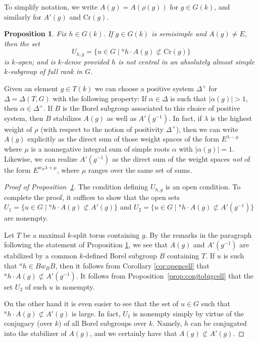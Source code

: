 \documentclass{amsart}
\theoremstyle{plain}
\newtheorem{proposition}[theorem]{Proposition}
\theoremstyle{definition}
\theoremstyle{remark}
\providecommand{\abs}[1]{\lvert#1\rvert}
\begin{document}
To simplify notation, we write $A(g) = A(\rho(g))$ for $g \in G(k)$, and
similarly for $A'(g)$ and $\mathrm{Cr}(g)$.

\begin{proposition}\label{prop:dyslexictits}
Fix $h\in G(k)$. If $g \in G(k)$ is semisimple and $A(g) \neq E$, then the set
$$U_{h, g} = \{u \in G \mid \mbox{}^{u}h\cdot A(g) \not\subset \mathrm{Cr}(g)\}$$
is $k$-open; and is $k$-dense provided $h$ is not central in an absolutely almost simple
$k$-subgroup of full rank in $G$.
\end{proposition}

Given an element $g \in T(k)$ we
can choose a positive system $\Delta^{+}$ for $\Delta = \Delta(T, G)$ with the
following
property: If $\alpha \in \Delta$ is such that $\abs{\alpha(g)} > 1$, then $\alpha
\in \Delta^{+}$.
If $B$ is the Borel subgroup associated to this choice of positive system, then $B$
stabilizes $A(g)$ as well as $A'(g^{-1})$.
In fact, if $\lambda$ is the highest weight
of $\rho$ (with respect to the notion of positivity
$\Delta^{+}$), then we can write $A(g)$ explicitly as the direct sum of those weight
spaces of the form $E^{\lambda - \mu}$ where $\mu$ is a nonnegative integral sum of
simple roots $\alpha$ with $\abs{\alpha(g)} = 1$. Likewise, we can realize
$A'(g^{-1})$  as the direct sum of the weight spaces \emph{not} of the form $E^{w_{B}\lambda +
\mu}$, where $\mu$ ranges over the same set of sums.

\begin{proof}[Proof of Proposition~\ref{prop:dyslexictits}]
The condition defining $U_{h, g}$ is an open condition. To complete the proof, it
suffices to show that the open sets $U_{1} = \{u \in G \mid \mbox{}^{u}h\cdot A(g) \not\subset
A'(g)\}$ and $U_{2} = \{u \in G \mid \mbox{}^{u}h\cdot A(g) \not\subset
A'(g^{-1})\}$ are nonempty.

Let $T$ be a maximal $k$-split torus containing $g$. By the remarks in the paragraph
following the statement of Proposition
\ref{prop:dyslexictits}, we see that $A(g)$ and $A'(g^{-1})$ are stabilized by a common
$k$-defined Borel subgroup $B$ containing $T$. If $u$ is such that $\mbox{}^{u}h \in
Bw_{B}B$, then it follows from Corollary \ref{cor:opencell} that
$\mbox{}^{u}h \cdot A(g) \not\subset A'(g^{-1})$. It follows from Proposition~\ref{prop:conjtobigcell}
that the set $U_{2}$ of such $u$ is nonempty.

On the other hand it is even easier to see that the set of $u \in G$
such that $\mbox{}^{u}h\cdot A(g) \not\subset A'(g)$ is large. In fact, $U_{1}$
is nonempty simply by virtue of the conjugacy (over $k$) of all Borel
subgroups over $k$. Namely, $h$ can be conjugated into the
stabilizer of $A(g)$, and we certainly have that $A(g) \not\subset A'(g)$.
\end{proof}
\end{document}
